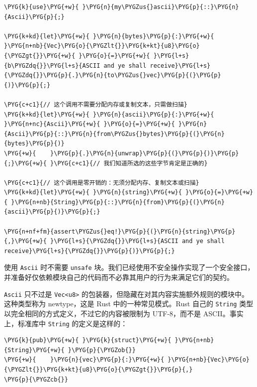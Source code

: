 \begin{Verbatim}[commandchars=\\\{\},breaklines=true,breakanywhere=true,fontsize=\codefont,xleftmargin=17bp]
\PYG{k}{use}\PYG{+w}{ }\PYG{n}{my\PYGZus{}ascii}\PYG{p}{::}\PYG{n}{Ascii}\PYG{p}{;}

\PYG{k+kd}{let}\PYG{+w}{ }\PYG{n}{bytes}\PYG{p}{:}\PYG{+w}{ }\PYG{n+nb}{Vec}\PYG{o}{\PYGZlt{}}\PYG{k+kt}{u8}\PYG{o}{\PYGZgt{}}\PYG{+w}{ }\PYG{o}{=}\PYG{+w}{ }\PYG{l+s}{b\PYGZdq{}}\PYG{l+s}{ASCII and ye shall receive}\PYG{l+s}{\PYGZdq{}}\PYG{p}{.}\PYG{n}{to\PYGZus{}vec}\PYG{p}{(}\PYG{p}{)}\PYG{p}{;}

\PYG{c+c1}{// 这个调用不需要分配内存或复制文本，只需做扫描}
\PYG{k+kd}{let}\PYG{+w}{ }\PYG{n}{ascii}\PYG{p}{:}\PYG{+w}{ }\PYG{n+nc}{Ascii}\PYG{+w}{ }\PYG{o}{=}\PYG{+w}{ }\PYG{n}{Ascii}\PYG{p}{::}\PYG{n}{from\PYGZus{}bytes}\PYG{p}{(}\PYG{n}{bytes}\PYG{p}{)}
\PYG{+w}{    }\PYG{p}{.}\PYG{n}{unwrap}\PYG{p}{(}\PYG{p}{)}\PYG{p}{;}\PYG{+w}{ }\PYG{c+c1}{// 我们知道所选的这些字节肯定是正确的}

\PYG{c+c1}{// 这个调用是零开销的：无须分配内存、复制文本或扫描}
\PYG{k+kd}{let}\PYG{+w}{ }\PYG{n}{string}\PYG{+w}{ }\PYG{o}{=}\PYG{+w}{ }\PYG{n+nb}{String}\PYG{p}{::}\PYG{n}{from}\PYG{p}{(}\PYG{n}{ascii}\PYG{p}{)}\PYG{p}{;}

\PYG{n+nf+fm}{assert\PYGZus{}eq!}\PYG{p}{(}\PYG{n}{string}\PYG{p}{,}\PYG{+w}{ }\PYG{l+s}{\PYGZdq{}}\PYG{l+s}{ASCII and ye shall receive}\PYG{l+s}{\PYGZdq{}}\PYG{p}{)}\PYG{p}{;}
\end{Verbatim}

使用 \texttt{Ascii} 时不需要 \texttt{unsafe} 块。我们已经使用不安全操作实现了一个安全接口，并准备好仅依赖模块自己的代码而不必靠其用户的行为来满足它们的契约。

\texttt{Ascii} 只不过是 \texttt{Vec<u8>} 的包装器，但隐藏在对其内容实施额外规则的模块中。这种类型称为 newtype，这是 Rust 中的一种常见模式。Rust 自己的 \texttt{String} 类型以完全相同的方式定义，不过它的内容被限制为 UTF-8，而不是 ASCII。事实上，标准库中 \texttt{String} 的定义是这样的：

\begin{Verbatim}[commandchars=\\\{\},breaklines=true,breakanywhere=true,fontsize=\codefont,xleftmargin=17bp]
\PYG{k}{pub}\PYG{+w}{ }\PYG{k}{struct}\PYG{+w}{ }\PYG{n+nb}{String}\PYG{+w}{ }\PYG{p}{\PYGZob{}}
\PYG{+w}{    }\PYG{n}{vec}\PYG{p}{:}\PYG{+w}{ }\PYG{n+nb}{Vec}\PYG{o}{\PYGZlt{}}\PYG{k+kt}{u8}\PYG{o}{\PYGZgt{}}\PYG{p}{,}
\PYG{p}{\PYGZcb{}}
\end{Verbatim}


